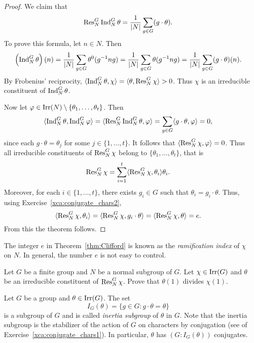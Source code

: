 \begin{proof}
    We claim that 
    \[
    \operatorname{Res}_N^G\operatorname{Ind}_N^G\theta=\frac{1}{|N|}\sum_{g\in G}(g\cdot\theta).
    \]
    To prove this formula, let $n\in N$. Then 
    \[
    \left(\operatorname{Ind}_N^G\theta\right)(n)
    =\frac{1}{|N|}\sum_{g\in G}\theta^0(g^{-1}ng)
    =\frac{1}{|N|}\sum_{g\in G}\theta(g^{-1}ng)
    =\frac{1}{|N|}\sum_{g\in G}(g\cdot\theta)(n).
    \]
    By Frobenius' reciprocity, 
    $\langle\operatorname{Ind}_N^G\theta,\chi\rangle=\langle\theta,\operatorname{Res}_N^G\chi\rangle>0$. 
    Thus $\chi$ is an irreducible constituent of $\operatorname{Ind}_N^G\theta$. 
    
    Now 
    let $\varphi\in\operatorname{Irr}(N)\setminus\{\theta_1,\dots,\theta_t\}$. Then
    \[
    \langle \operatorname{Ind}_N^G\theta, \operatorname{Ind}_N^G\varphi\rangle
    =\langle \operatorname{Res}_N^G\operatorname{Ind}_N^G\theta,\varphi\rangle
    =\sum_{g\in G}\langle g\cdot\theta,\varphi\rangle=0,
    \]
    since each $g\cdot\theta=\theta_j$ for some $j\in\{1,\dots,t\}$. 
    It follows that $\langle\operatorname{Res}_N^G\chi,\varphi\rangle=0$. 
    Thus all irreducible constituents of $\operatorname{Res}_N^G\chi$ belong
    to $\{\theta_1,\dots,\theta_t\}$, that is
    \[
\operatorname{Res}_N^G\chi=\sum_{i=1}^t\langle\operatorname{Res}_N^G\chi,\theta_i\rangle\theta_i.
    \]
    Moreover, for each $i\in\{1,\dots,t\}$, 
    there exists $g_i\in G$ such that
    $\theta_i=g_i\cdot\theta$. Thus, using Exercise~\ref{xca:conjugate_chars2}, 
    \[
    \langle\operatorname{Res}_N^G\chi,\theta_i\rangle=\langle\operatorname{Res}_N^G\chi,g_i\cdot\theta\rangle=\langle\operatorname{Res}_N^G\chi,\theta\rangle=e.\]
    From this the theorem follows. 
\end{proof}

The integer $e$ in Theorem~\ref{thm:Clifford} is known as the \emph{ramification index} of $\chi$ on $N$. In general, the number $e$ is not easy to control. 

\begin{exercise}
\label{xca:Clifford_divisibility}
    Let $G$ be a finite group and $N$ be a normal subgroup of $G$. Let $\chi\in\operatorname{Irr}(G)$ and $\theta$ 
    be an irreducible constituent of $\operatorname{Res}_N^G\chi$. 
    Prove that $\theta(1)$ divides $\chi(1)$. 
\end{exercise}

Let $G$ be a group and $\theta\in\operatorname{Irr}(G)$. The set 
\[
I_G(\theta)=\{g\in G:g\cdot\theta=\theta\}
\]
is a subgroup of $G$ and is called \emph{inertia subgroup} of $\theta$ in $G$. Note that the inertia
subgroup is the stabilizer of the action of $G$ 
on characters by conjugation (see 
of Exercise~\ref{xca:conjugate_chars1}). In particular, 
$\theta$ has 
$(G:I_G(\theta))$ conjugates. 

